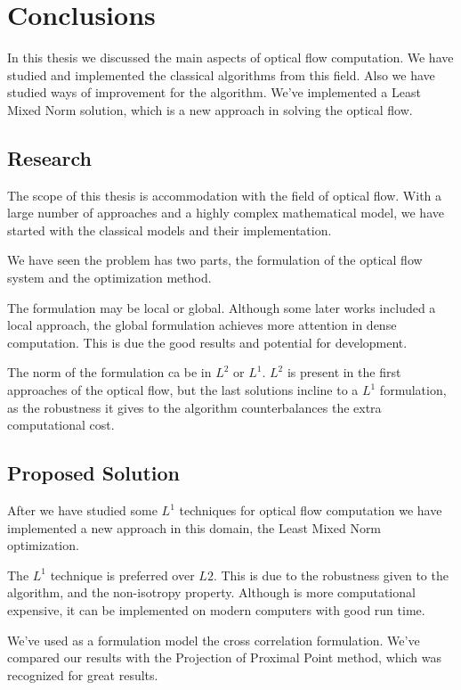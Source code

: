 \documentclass[12pt,a4paper,twoside]{report}
\begin{document}
{\chapter{Conclusions}

In this thesis we discussed the main aspects of optical flow computation. We have studied and implemented the classical algorithms from this field. Also we have studied ways of improvement for the algorithm. We've implemented a Least Mixed Norm solution, which is a new approach in solving the optical flow.


\section{Research}
The scope of this thesis is accommodation with the field of optical flow. With a large number of approaches and a highly complex mathematical model, we have started with the classical models and their implementation. 

We have seen the problem has two parts, the formulation of the optical flow system and the optimization method.

The formulation may be local or global. Although some later works included a local approach, the global formulation achieves more attention in dense computation. This is due the good results and potential for development.

The norm of the formulation ca be in $L^2$ or $L^1$. $L^2$ is present in the first approaches of the optical flow, but the last solutions incline to a $L^1$ formulation, as the robustness it gives to the algorithm counterbalances the extra computational cost.

\section{Proposed Solution}

After we have studied some $L^1$ techniques for optical flow computation we have implemented a new approach in this domain, the Least Mixed Norm optimization.

The $L^1$ technique is preferred over $L2$. This is due to the robustness given to the algorithm, and the non-isotropy property. Although is more computational expensive, it can be implemented on modern computers with good run time.  

 We've used as a formulation model the cross correlation formulation. We've compared our results with the Projection of Proximal Point method, which was recognized for great results.
 
}
\end{document}

